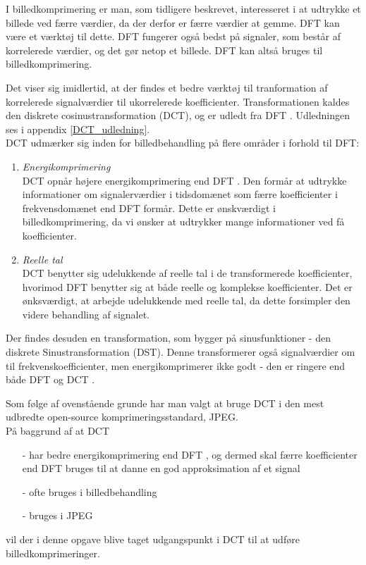 I billedkomprimering er man, som tidligere beskrevet, interesseret i at udtrykke et billede ved færre værdier, da der derfor er færre værdier at gemme. DFT kan være et værktøj til dette. DFT fungerer også bedst på signaler, som består af korrelerede værdier, og det gør netop et billede. DFT kan altså bruges til billedkomprimering.

Det viser sig imidlertid, at der findes et bedre værktøj til tranformation af korrelerede signalværdier til ukorrelerede koefficienter. Transformationen kaldes den diskrete cosinustransformation (DCT), og er udledt fra DFT \citep{dft_argument}. Udledningen ses i appendix \vref{DCT_udledning}.\\
DCT udmærker sig inden for billedbehandling på flere områder i forhold til DFT:
\begin{enumerate}
\item \textit{Energikomprimering}\\
	DCT opnår højere energikomprimering end DFT \citep{smcnus_energy}. Den formår at udtrykke informationer om signalerværdier i tidsdomænet som færre koefficienter i frekvensdomænet end DFT formår. Dette er ønskværdigt i billedkomprimering, da vi ønsker at udtrykker mange informationer ved få koefficienter.
\item \textit{Reelle tal}\\
	DCT benytter sig udelukkende af reelle tal i de transformerede koefficienter, hvorimod DFT benytter sig at både reelle og komplekse koefficienter. Det er ønksværdigt, at arbejde udelukkende med reelle tal, da dette forsimpler den videre behandling af signalet.
\end{enumerate}
Der findes desuden en transformation, som bygger på sinusfunktioner - den diskrete Sinustransformation (DST). Denne transformerer også signalværdier om til frekvenskoefficienter, men energikomprimerer ikke godt - den er ringere end både DFT og DCT \citep{smcnus_energy}.

Som følge af ovenstående grunde har man valgt at bruge DCT i den mest udbredte open-source komprimeringsstandard, JPEG.\\
På baggrund af at DCT
\begin{itemize}
\item[-] har bedre energikomprimering end DFT \citep{smcnus_energy}, og dermed skal færre koefficienter end DFT bruges til at danne en god approksimation af et signal \citep{dft_argument}
\item[-] ofte bruges i billedbehandling \citep{DCTbrugestit}
\item[-] bruges i JPEG \citep{dft_argument}
\end{itemize}
vil der i denne opgave blive taget udgangspunkt i DCT til at udføre billedkomprimeringer.

